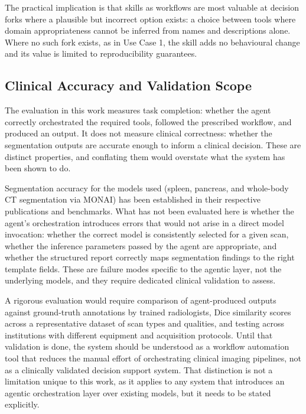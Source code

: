 \documentclass[conference]{IEEEtran}
\begin{document}
The practical implication is that skills as workflows are most valuable at decision forks where a plausible but incorrect option exists: a choice between tools where domain appropriateness cannot be inferred from names and descriptions alone. Where no such fork exists, as in Use Case 1, the skill adds no behavioural change and its value is limited to reproducibility guarantees.

\subsection{Clinical Accuracy and Validation Scope}

The evaluation in this work measures task completion: whether the agent correctly orchestrated the required tools, followed the prescribed workflow, and produced an output. It does not measure clinical correctness: whether the segmentation outputs are accurate enough to inform a clinical decision. These are distinct properties, and conflating them would overstate what the system has been shown to do.

Segmentation accuracy for the models used (spleen, pancreas, and whole-body CT segmentation via MONAI) has been established in their respective publications and benchmarks. What has not been evaluated here is whether the agent's orchestration introduces errors that would not arise in a direct model invocation: whether the correct model is consistently selected for a given scan, whether the inference parameters passed by the agent are appropriate, and whether the structured report correctly maps segmentation findings to the right template fields. These are failure modes specific to the agentic layer, not the underlying models, and they require dedicated clinical validation to assess.

A rigorous evaluation would require comparison of agent-produced outputs against ground-truth annotations by trained radiologists, Dice similarity scores across a representative dataset of scan types and qualities, and testing across institutions with different equipment and acquisition protocols. Until that validation is done, the system should be understood as a workflow automation tool that reduces the manual effort of orchestrating clinical imaging pipelines, not as a clinically validated decision support system. That distinction is not a limitation unique to this work, as it applies to any system that introduces an agentic orchestration layer over existing models, but it needs to be stated explicitly.
\end{document}
